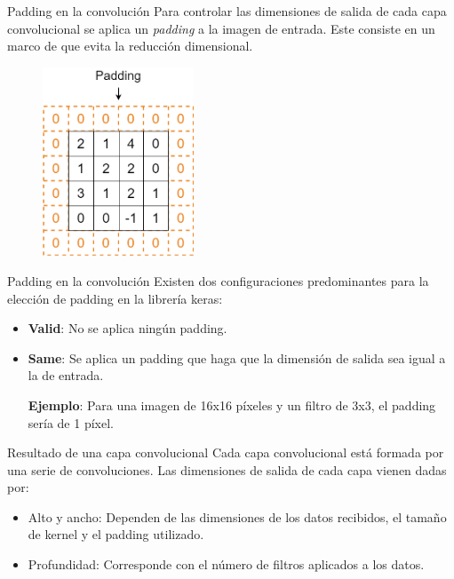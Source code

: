 \begin{frame}{Padding en la convolución}
Para controlar las \alert{dimensiones de salida} de cada capa convolucional se aplica un \textit{\alert{padding}} a la imagen de entrada. Este consiste en un marco de  que evita la reducción dimensional.

\begin{figure}
    \centering
    \includegraphics[width=0.4\textwidth]{Slides/figures/Tema 2/Padding.png}
\end{figure}
\end{frame}

\begin{frame}{Padding en la convolución}
Existen dos \alert{configuraciones} predominantes para la elección de padding en la librería \alert{keras}:
\begin{itemize}
    \item \textbf{\alert{Valid}}: No se aplica \alert{ningún} padding.
    \item \textbf{\alert{Same}}: Se aplica un padding que haga que la \alert{dimensión de salida} sea igual a la de \alert{entrada}.
    
    \vfill
    {\large \textbf{Ejemplo}: Para una imagen de 16x16 píxeles y un filtro de 3x3, el padding  sería de 1 píxel.}
\end{itemize}
\end{frame}

\begin{frame}{Resultado de una capa convolucional}
Cada \alert{capa convolucional} está formada por una serie de convoluciones. Las \alert{dimensiones de salida} de cada capa vienen dadas por:
\begin{itemize}
    \item \alert{Alto y ancho}: Dependen de las dimensiones de los \alert{datos recibidos}, el tamaño de \alert{kernel} y el \alert{padding} utilizado.
    \item \alert{Profundidad}: Corresponde con el \alert{número de filtros} aplicados a los datos.
\end{itemize}
\end{frame}

